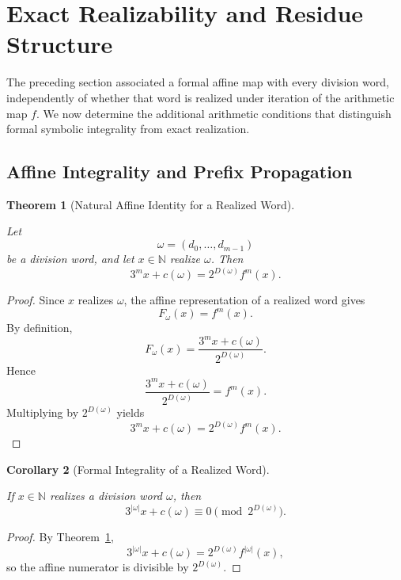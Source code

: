 \documentclass[12pt, oneside]{article}
\numberwithin{equation}{section}
\theoremstyle{definition}
\theoremstyle{plain}
\newtheorem{theorem}{Theorem}[section]
\newtheorem{corollary}[theorem]{Corollary}
\theoremstyle{remark}
\begin{document}
\section{Exact Realizability and Residue Structure}
\label{sec:exact-realizability-residue}

The preceding section associated a formal affine map with every division
word, independently of whether that word is realized under iteration of the
arithmetic map \(f\). We now determine the additional arithmetic conditions
that distinguish formal symbolic integrality from exact realization.

\subsection{Affine Integrality and Prefix Propagation}

\begin{theorem}[Natural Affine Identity for a Realized Word]
\label{thm:natural-affine-identity}

Let
\[
\omega=(d_0,\dots,d_{m-1})
\]
be a division word, and let \(x\in\mathbb N\) realize \(\omega\). Then
\[
3^m x+c(\omega)
=
2^{D(\omega)}f^m(x).
\]
\end{theorem}

\begin{proof}
Since \(x\) realizes \(\omega\), the affine representation of a realized
word gives
\[
F_\omega(x)=f^m(x).
\]
By definition,
\[
F_\omega(x)
=
\frac{3^m x+c(\omega)}{2^{D(\omega)}}.
\]
Hence
\[
\frac{3^m x+c(\omega)}{2^{D(\omega)}}
=
f^m(x).
\]
Multiplying by \(2^{D(\omega)}\) yields
\[
3^m x+c(\omega)
=
2^{D(\omega)}f^m(x).
\]
\end{proof}

\begin{corollary}[Formal Integrality of a Realized Word]
\label{cor:realized-formal-integrality}

If \(x\in\mathbb N\) realizes a division word \(\omega\), then
\[
3^{|\omega|}x+c(\omega)
\equiv
0
\pmod{2^{D(\omega)}}.
\]
\end{corollary}

\begin{proof}
By Theorem~\ref{thm:natural-affine-identity},
\[
3^{|\omega|}x+c(\omega)
=
2^{D(\omega)}f^{|\omega|}(x),
\]
so the affine numerator is divisible by \(2^{D(\omega)}\).
\end{proof}
\end{document}
